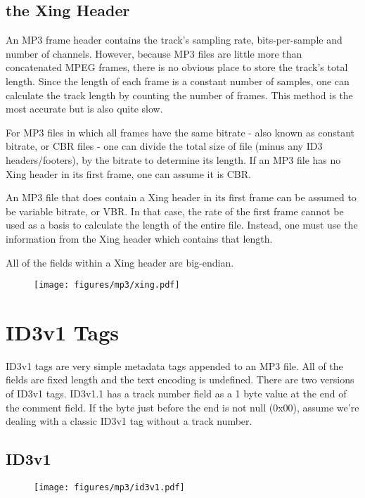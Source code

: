 \subsection{the Xing Header}

An MP3 frame header contains the track's sampling rate,
bits-per-sample and number of channels.
However, because MP3 files are little more than
concatenated MPEG frames, there is no obvious place to
store the track's total length.
Since the length of each frame is a constant number of samples,
one can calculate the track length by counting the number of frames.
This method is the most accurate but is also quite slow.

For MP3 files in which all frames have the same bitrate
- also known as constant bitrate, or CBR files -
one can divide the total size of file (minus any ID3 headers/footers),
by the bitrate to determine its length.
If an MP3 file has no Xing header in its first frame,
one can assume it is CBR.

An MP3 file that does contain a Xing header in its first frame
can be assumed to be variable bitrate, or VBR.
In that case, the rate of the first frame cannot be used as a
basis to calculate the length of the entire file.
Instead, one must use the information from the Xing header
which contains that length.

All of the fields within a Xing header are big-endian.
\begin{figure}[h]
\texttt{[image: figures/mp3/xing.pdf]}
\end{figure}

\section{ID3v1 Tags}
ID3v1 tags are very simple metadata tags appended to an MP3 file.
All of the fields are fixed length and the text encoding is
undefined.
There are two versions of ID3v1 tags.
ID3v1.1 has a track number field as a 1 byte value
at the end of the comment field.
If the byte just before the end is not null (0x00),
assume we're dealing with a classic ID3v1 tag without a
track number.

\subsection{ID3v1}

\begin{figure}[h]
\texttt{[image: figures/mp3/id3v1.pdf]}
\end{figure}

